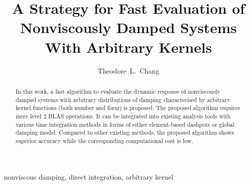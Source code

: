 \documentclass[3p,11pt,fleqn,review,sort&compress]{elsarticle}
\begin{document}
\linenumbers
\begin{abstract}
\begin{linenumbers}
In this work, a fast algorithm to evaluate the dynamic response of nonviscously damped systems with arbitrary distributions of damping characterised by arbitrary kernel functions (both number and form) is proposed. The proposed algorithm requires mere level 2 BLAS operations. It can be integrated into existing analysis tools with various time integration methods in forms of either element-based dashpots or global damping model. Compared to other existing methods, the proposed algorithm shows superior accuracy while the corresponding computational cost is low.
\end{linenumbers}
\end{abstract}
\begin{keyword}
nonviscous damping\sep
direct integration\sep
arbitrary kernel
\end{keyword}
\begin{frontmatter}
\title{A Strategy for Fast Evaluation of Nonviscously Damped Systems With Arbitrary Kernels}
\author[add1]{Theodore~L.~Chang}
\address[add1]{IRIS Adlershof, Humboldt-Universität zu Berlin, Berlin, Germany, 12489.}
\end{frontmatter}






\end{document}
